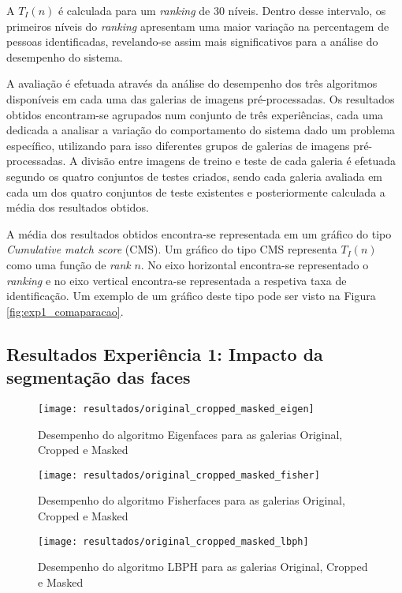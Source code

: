 A $T_{I}(n)$ é calculada para um \textit{ranking} de 30 níveis. Dentro desse intervalo, os primeiros níveis do \textit{ranking} apresentam uma maior variação na percentagem de pessoas identificadas, revelando-se assim mais significativos para a análise do desempenho do sistema.

A avaliação é efetuada através da análise do desempenho dos três algoritmos disponíveis em cada uma das galerias de imagens pré-processadas. Os resultados obtidos encontram-se agrupados num conjunto de três experiências, cada uma dedicada a analisar a variação do comportamento do sistema dado um problema específico, utilizando para isso diferentes grupos de galerias de imagens pré-processadas. A divisão entre imagens de treino e teste de cada galeria é efetuada segundo os quatro conjuntos de testes criados, sendo cada galeria avaliada em cada um dos quatro conjuntos de teste existentes e posteriormente calculada a média dos resultados obtidos.

A média dos resultados obtidos encontra-se representada em um gráfico do tipo \textit{Cumulative match score} (CMS). Um gráfico do tipo CMS representa $T_{I}(n)$ como uma função de \textit{rank} $n$. No eixo horizontal encontra-se representado o \textit{ranking} e no eixo vertical encontra-se representada a respetiva taxa de identificação. Um exemplo de um gráfico deste tipo pode ser visto na Figura \ref{fig:exp1_comaparacao}.

\subsection{Resultados Experiência 1: Impacto da segmentação das faces}

        \begin{figure}[ht]
                \centering
                \texttt{[image: resultados/original\_cropped\_masked\_eigen]}
                \caption{Desempenho do algoritmo Eigenfaces para as galerias Original, Cropped e Masked}
                \label{fig:original_cropped_masked_eigen}
        \end{figure}%

        \begin{figure}[p]
                \centering
                \texttt{[image: resultados/original\_cropped\_masked\_fisher]}
                \caption{Desempenho do algoritmo Fisherfaces para as galerias Original, Cropped e Masked}
                \label{fig:original_cropped_masked_fisher}
                \centering
                \texttt{[image: resultados/original\_cropped\_masked\_lbph]}
                \caption{Desempenho do algoritmo LBPH para as galerias Original, Cropped e Masked}
                \label{fig:original_cropped_masked_lbph}
        \end{figure}%
        

